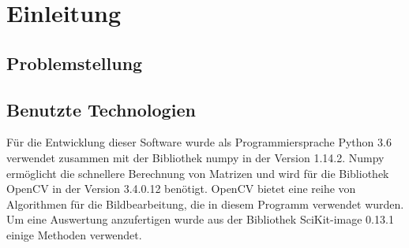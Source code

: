 \chapter{Einleitung}

\section{Problemstellung}

\section{Benutzte Technologien}
Für die Entwicklung dieser Software wurde als Programmiersprache Python 3.6 verwendet zusammen mit der Bibliothek numpy in der Version 1.14.2. Numpy ermöglicht die schnellere Berechnung von Matrizen und wird für die Bibliothek OpenCV in der Version 3.4.0.12 benötigt. OpenCV bietet eine reihe von Algorithmen für die Bildbearbeitung, die in diesem Programm verwendet wurden. Um eine Auswertung anzufertigen wurde aus der Bibliothek SciKit-image 0.13.1 einige Methoden verwendet.

